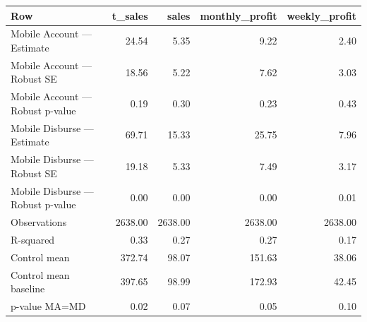 
\begin{tabular}{lrrrr}
\toprule
Row & t\_sales & sales & monthly\_profit & weekly\_profit\\
\midrule
Mobile Account — Estimate & 24.54 & 5.35 & 9.22 & 2.40\\
Mobile Account — Robust SE & 18.56 & 5.22 & 7.62 & 3.03\\
Mobile Account — Robust p-value & 0.19 & 0.30 & 0.23 & 0.43\\
Mobile Disburse — Estimate & 69.71 & 15.33 & 25.75 & 7.96\\
Mobile Disburse — Robust SE & 19.18 & 5.33 & 7.49 & 3.17\\
\addlinespace
Mobile Disburse — Robust p-value & 0.00 & 0.00 & 0.00 & 0.01\\
Observations & 2638.00 & 2638.00 & 2638.00 & 2638.00\\
R-squared & 0.33 & 0.27 & 0.27 & 0.17\\
Control mean & 372.74 & 98.07 & 151.63 & 38.06\\
Control mean baseline & 397.65 & 98.99 & 172.93 & 42.45\\
\addlinespace
p-value MA=MD & 0.02 & 0.07 & 0.05 & 0.10\\
\bottomrule
\end{tabular}
